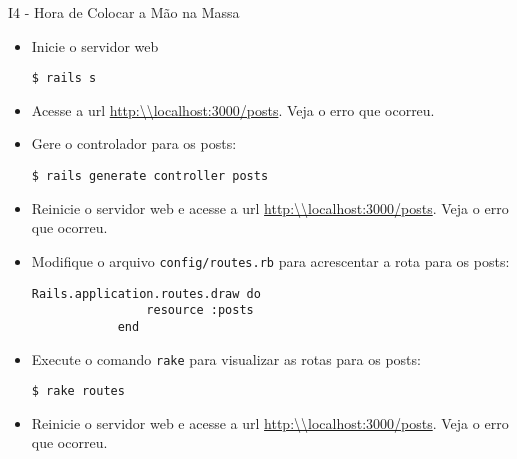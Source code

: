 \begin{frame}{I4 - Hora de Colocar a Mão na Massa}
	\begin{itemize}
		
		\item Inicie o servidor web
		\begin{lstlisting}[style=BashInputBasicStyle]
			$ rails s
		\end{lstlisting}
		
		\item Acesse a url \url{http:\\localhost:3000/posts}. Veja o erro que ocorreu.
		
		\item Gere o controlador para os posts:
		\begin{lstlisting}[style=BashInputBasicStyle]
			$ rails generate controller posts
		\end{lstlisting}
		
		\item Reinicie o servidor web e acesse a url \url{http:\\localhost:3000/posts}. Veja o erro que ocorreu.
		
		\item Modifique o arquivo \verb|config/routes.rb| para acrescentar a rota para
		os posts:
		\begin{lstlisting}[style=RubyInputStyle]
			Rails.application.routes.draw do 
				resource :posts
			end 
		\end{lstlisting}	
		
		\item Execute o comando \verb!rake! para visualizar as rotas para os
		posts:
		\begin{lstlisting}[style=BashInputBasicStyle]
			$ rake routes
		\end{lstlisting}
		
		\item Reinicie o servidor web e acesse a url \url{http:\\localhost:3000/posts}. Veja o erro que ocorreu.

	\end{itemize}
\end{frame}